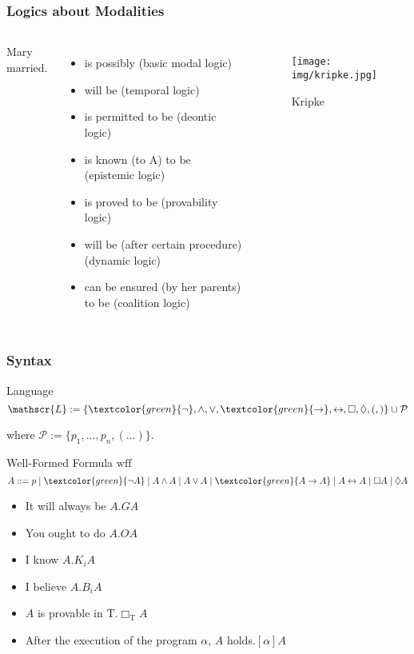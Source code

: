 \documentclass[UTF8,aspectratio=43,11pt,colorlinks,compress,openany]{beamer}%
\begin{document}
\begin{frame}\frametitle{Logics about Modalities}
\begin{columns}
Mary \underline{\phantom{xxxxx}} married.
\begin{itemize}
	\item is possibly (basic modal logic)
	\item will be (temporal logic)
	\item is permitted to be (deontic logic)
	\item is known (to A) to be (epistemic logic)
	\item is proved to be (provability logic)
	\item will be (after certain procedure) (dynamic logic)
	\item can be ensured (by her parents) to be (coalition logic)
\end{itemize}
\begin{figure}[H]
\texttt{[image: img/kripke.jpg]}\caption{Kripke}
\end{figure}
\end{columns}
\end{frame}

\begin{frame}\frametitle{Syntax}
\setlength\abovedisplayskip{0pt}
\setlength\belowdisplayskip{0pt}
	\begin{block}{Language}
		\[\mathscr{L}:=\{\textcolor{green}{\neg},\wedge,\vee,\textcolor{green}{\to},\leftrightarrow,\Box,\Diamond,(,)\}\cup\mathcal{P}\]
	\end{block}
	where $\mathcal{P}:=\{p_1,\dots,p_n,(\dots)\}$.
	\begin{block}{Well-Formed Formula $\mathrm{wff}$}
		\[A::=p\mid \textcolor{green}{\neg A}\mid A\wedge A\mid A\vee A\mid \textcolor{green}{A\to A}\mid A\leftrightarrow A\mid \Box A\mid \Diamond A\]
	\end{block}
	\begin{itemize}
		\item It will always be $A$.\hfill $GA$
		\item You ought to do $A$.\hfill $O A$
		\item I know $A$.\hfill $K_i A$
		\item I believe $A$.\hfill $B_i A$
		\item $A$ is provable in $\mathrm{T}$.\hfill $\Box_{\mathrm{T}}A$
		\item After the execution of the program $\alpha$, $A$ holds.\hfill $[\alpha]A$
	\end{itemize}
\end{frame}
\end{document}

